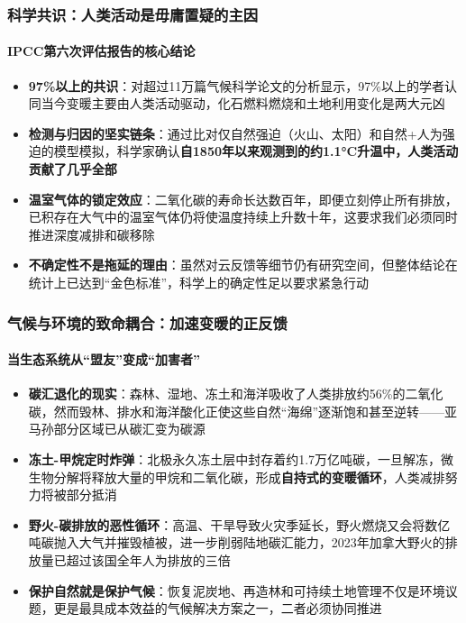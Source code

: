 \documentclass[11pt]{beamer}
\begin{document}
\begin{frame}
\frametitle{科学共识：人类活动是毋庸置疑的主因}
\framesubtitle{IPCC第六次评估报告的核心结论}
\begin{itemize}
    \item \textbf{97\%以上的共识}：对超过11万篇气候科学论文的分析显示，\alert{97\%以上的学者}认同当今变暖主要由人类活动驱动，化石燃料燃烧和土地利用变化是两大元凶
    \item \textbf{检测与归因的坚实链条}：通过比对仅自然强迫（火山、太阳）和自然+人为强迫的模型模拟，科学家确认\textbf{自1850年以来观测到的约1.1°C升温中，人类活动贡献了几乎全部}
    \item \textbf{温室气体的锁定效应}：二氧化碳的寿命长达数百年，即便立刻停止所有排放，已积存在大气中的温室气体仍将使温度持续上升数十年，这要求我们必须同时推进\alert{深度减排}和\alert{碳移除}
    \item \textbf{不确定性不是拖延的理由}：虽然对云反馈等细节仍有研究空间，但整体结论在统计上已达到“金色标准”，科学上的确定性足以要求紧急行动
\end{itemize}
\end{frame}

\begin{frame}
\frametitle{气候与环境的致命耦合：加速变暖的正反馈}
\framesubtitle{当生态系统从“盟友”变成“加害者”}
\begin{itemize}
    \item \textbf{碳汇退化的现实}：森林、湿地、冻土和海洋吸收了人类排放约56\%的二氧化碳，然而毁林、排水和海洋酸化正使这些自然“海绵”逐渐饱和甚至逆转——\alert{亚马孙部分区域已从碳汇变为碳源}
    \item \textbf{冻土-甲烷定时炸弹}：北极永久冻土层中封存着约1.7万亿吨碳，一旦解冻，微生物分解将释放大量的甲烷和二氧化碳，形成\textbf{自持式的变暖循环}，人类减排努力将被部分抵消
    \item \textbf{野火-碳排放的恶性循环}：高温、干旱导致火灾季延长，野火燃烧又会将数亿吨碳抛入大气并摧毁植被，进一步削弱陆地碳汇能力，2023年加拿大野火的排放量已超过该国全年人为排放的三倍
    \item \textbf{保护自然就是保护气候}：恢复泥炭地、再造林和可持续土地管理不仅是环境议题，更是\alert{最具成本效益的气候解决方案之一}，二者必须协同推进
\end{itemize}
\end{frame}
\end{document}
